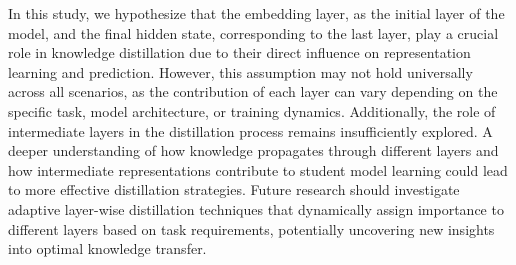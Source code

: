 In this study, we hypothesize that the embedding layer, as the initial layer of the model, and the final hidden state, corresponding to the last layer, play a crucial role in knowledge distillation due to their direct influence on representation learning and prediction. However, this assumption may not hold universally across all scenarios, as the contribution of each layer can vary depending on the specific task, model architecture, or training dynamics. Additionally, the role of intermediate layers in the distillation process remains insufficiently explored. A deeper understanding of how knowledge propagates through different layers and how intermediate representations contribute to student model learning could lead to more effective distillation strategies. Future research should investigate adaptive layer-wise distillation techniques that dynamically assign importance to different layers based on task requirements, potentially uncovering new insights into optimal knowledge transfer.